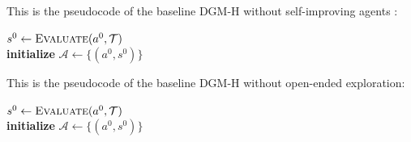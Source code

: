 \documentclass{article}
\begin{document}
This is the pseudocode of the baseline DGM-H without self-improving agents \citep[ADAS,][]{huautomated}:

\begin{algorithm}[H]
\DontPrintSemicolon
\SetAlgoLined
{}
\BlankLine
$s^{0} \leftarrow \textsc{Evaluate}(a^{0}, \mathcal{T})$ \\
\textbf{initialize} $\mathcal{A} \leftarrow \{(a^{0}, s^{0})\}$ \\
\caption{DGM-H without self-improving meta agents (DGM-H w/o self-improve)}
\label{algo:DGM-H-wo-selfimprove}
\end{algorithm}

This is the pseudocode of the baseline DGM-H without open-ended exploration:

\begin{algorithm}[H]
\DontPrintSemicolon
\SetAlgoLined
{}
\BlankLine
$s^{0} \leftarrow \textsc{Evaluate}(a^{0}, \mathcal{T})$ \\
\textbf{initialize} $\mathcal{A} \leftarrow \{(a^{0}, s^{0})\}$ \\
\caption{DGM-H without open-ended exploration (DGM-H w/o open-ended exploration)}
\label{algo:DGM-H-wo-openended}
\end{algorithm}
\end{document}

